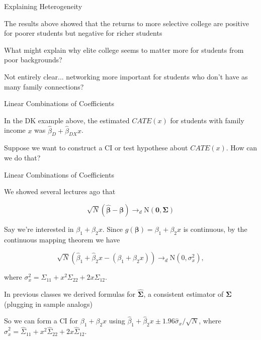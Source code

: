 \documentclass[11pt,english,handout]{beamer}
\newenvironment{wideitemize}{\itemize\addtolength{\itemsep}{10pt}}{\enditemize}
\begin{document}
\begin{frame}{Explaining Heterogeneity}
	\begin{wideitemize}
		\item
		The results above showed that the returns to more selective college are positive for poorer students but negative for richer students
		
		\pause
		\item What might explain why elite college seems to matter more for students from poor backgrounds? \pause
		
		\item
		Not entirely clear... networking more important for students who don't have as many family connections?
	
		
	\end{wideitemize}
\end{frame}


\begin{frame}{Linear Combinations of Coefficients}
	\begin{wideitemize}
		\item
		In the DK example above, the estimated $CATE(x)$ for students with family income $x$ was $\hat\beta_D+ \hat\beta_{DX} x$.
		
		\pause
		\item
		Suppose we want to construct a CI or test hypothese about $CATE(x)$. How can we do that?
		
	\end{wideitemize}
\end{frame}


\begin{frame}{Linear Combinations of Coefficients}
	\begin{wideitemize}
		\item
		We showed several lectures ago that 
		
		$$\sqrt{N} (\bm{\hat\beta} - \bm\beta ) \rightarrow_d \mathrm{N}(\bm{0}, \bm{\Sigma}) $$
		
		\pause
		\item
		Say we're interested in $\beta_1 + \beta_2 x$. \pause{} Since $g(\bm{\beta}) = \beta_1 + \beta_2x$ is continuous, by the continuous mapping theorem we have \pause{}
		
		$$\sqrt{N}( \hat\beta_1 + \hat\beta_{2} x- ( \beta_1 + \beta_{2} x)) \rightarrow_d \mathrm{N}(0, \sigma_x^2) ,$$
		
		\noindent where $\sigma_x^2 = \Sigma_{11} + x^2 \Sigma_{22} + 2 x \Sigma_{12}$.
		
		
		\pause
		\item
		In previous classes we derived formulas for $\hat{\bm{\Sigma}}$, a consistent estimator of $\bm{\Sigma}$ (plugging in sample analogs) 
				
		\pause
		\item
		So we can form a CI for $\beta_1 + \beta_2 x$ using $\hat\beta_1 + \hat\beta_2 x \pm 1.96 \hat\sigma_x / \sqrt{N}$, where $\hat{\sigma}_x^2 = \hat\Sigma_{11} + x^2 \hat\Sigma_{22} + 2 x   \hat\Sigma_{12}$.
	\end{wideitemize}
\end{frame}
\end{document}
